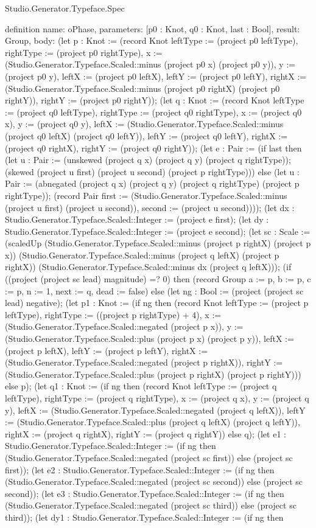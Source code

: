 \begin{lexlean}{Studio.Generator.Typeface.Spec}
\begin{semanticmodule}
definition{
  name: oPhase,
  parameters: [p0 : Knot, q0 : Knot, last : Bool],
  result: Group,
  body: (let p : Knot := (record Knot {leftType := (project p0 leftType), rightType := (project p0 rightType), x := (Studio.Generator.Typeface.Scaled::minus (project p0 x) (project p0 y)), y := (project p0 y), leftX := (project p0 leftX), leftY := (project p0 leftY), rightX := (Studio.Generator.Typeface.Scaled::minus (project p0 rightX) (project p0 rightY)), rightY := (project p0 rightY)}); (let q : Knot := (record Knot {leftType := (project q0 leftType), rightType := (project q0 rightType), x := (project q0 x), y := (project q0 y), leftX := (Studio.Generator.Typeface.Scaled::minus (project q0 leftX) (project q0 leftY)), leftY := (project q0 leftY), rightX := (project q0 rightX), rightY := (project q0 rightY)}); (let e : Pair := (if last then (let u : Pair := (unskewed (project q x) (project q y) (project q rightType)); (skewed (project u first) (project u second) (project p rightType))) else (let u : Pair := (abnegated (project q x) (project q y) (project q rightType) (project p rightType)); (record Pair {first := (Studio.Generator.Typeface.Scaled::minus (project u first) (project u second)), second := (project u second)}))); (let dx : Studio.Generator.Typeface.Scaled::Integer := (project e first); (let dy : Studio.Generator.Typeface.Scaled::Integer := (project e second); (let sc : Scale := (scaledUp (Studio.Generator.Typeface.Scaled::minus (project p rightX) (project p x)) (Studio.Generator.Typeface.Scaled::minus (project q leftX) (project p rightX)) (Studio.Generator.Typeface.Scaled::minus dx (project q leftX))); (if ((project (project sc lead) magnitude) =? 0) then (record Group {a := p, b := p, c := p, n := 1, next := q, dead := false}) else (let ng : Bool := (project (project sc lead) negative); (let p1 : Knot := (if ng then (record Knot {leftType := (project p leftType), rightType := ((project p rightType) + 4), x := (Studio.Generator.Typeface.Scaled::negated (project p x)), y := (Studio.Generator.Typeface.Scaled::plus (project p x) (project p y)), leftX := (project p leftX), leftY := (project p leftY), rightX := (Studio.Generator.Typeface.Scaled::negated (project p rightX)), rightY := (Studio.Generator.Typeface.Scaled::plus (project p rightX) (project p rightY))}) else p); (let q1 : Knot := (if ng then (record Knot {leftType := (project q leftType), rightType := (project q rightType), x := (project q x), y := (project q y), leftX := (Studio.Generator.Typeface.Scaled::negated (project q leftX)), leftY := (Studio.Generator.Typeface.Scaled::plus (project q leftX) (project q leftY)), rightX := (project q rightX), rightY := (project q rightY)}) else q); (let e1 : Studio.Generator.Typeface.Scaled::Integer := (if ng then (Studio.Generator.Typeface.Scaled::negated (project sc first)) else (project sc first)); (let e2 : Studio.Generator.Typeface.Scaled::Integer := (if ng then (Studio.Generator.Typeface.Scaled::negated (project sc second)) else (project sc second)); (let e3 : Studio.Generator.Typeface.Scaled::Integer := (if ng then (Studio.Generator.Typeface.Scaled::negated (project sc third)) else (project sc third)); (let dy1 : Studio.Generator.Typeface.Scaled::Integer := (if ng then }
\end{semanticmodule}
\end{lexlean}
